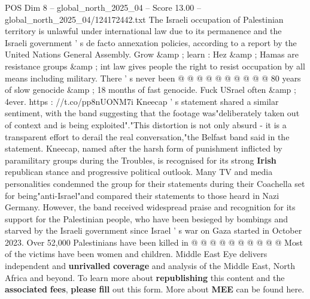 \begin{textsample}{POS Dim 8 – global\_north\_2025\_04 – Score 13.00 – global\_north\_2025\_04/124172442.txt}
The Israeli occupation of Palestinian territory is unlawful under international law due to its permanence and the Israeli government ' s de facto annexation policies, according to a report by the United Nations General Assembly.
Grow \&amp ; learn : Hez \&amp ; Hamas are resistance groups \&amp ; int law gives people the right to resist occupation by all means including military.
There ' s never been @ @ @ @ @ @ @ @ @ @ 80 years of slow genocide \&amp ; 18 months of fast genocide.
Fuck USrael often \&amp ; 4ever. https : //t.co/pp8nUONM7i Kneecap ' s statement shared a similar sentiment, with the band suggesting that the footage was"deliberately taken out of context and is being exploited"."This distortion is not only absurd - it is a transparent effort to derail the real conversation,"the Belfast band said in the statement.
Kneecap, named after the harsh form of punishment inflicted by paramilitary groups during the Troubles, is recognised for its strong \textbf{Irish} republican stance and progressive political outlook.
Many TV and media personalities condemned the group for their statements during their Coachella set for being"anti-Israel"and compared their statements to those heard in Nazi Germany.
However, the band received widespread praise and recognition for its support for the Palestinian people, who have been besieged by bombings and starved by the Israeli government since Israel ' s war on Gaza started in October 2023.
Over 52,000 Palestinians have been killed in @ @ @ @ @ @ @ @ @ @ Most of the victims have been women and children.
Middle East Eye delivers independent and \textbf{unrivalled} \textbf{coverage} and analysis of the Middle East, North Africa and beyond.
To learn more about \textbf{republishing} this content and the \textbf{associated} \textbf{fees}, \textbf{please} \textbf{fill} out this form.
More about \textbf{MEE} can be found here.

\end{textsample}
